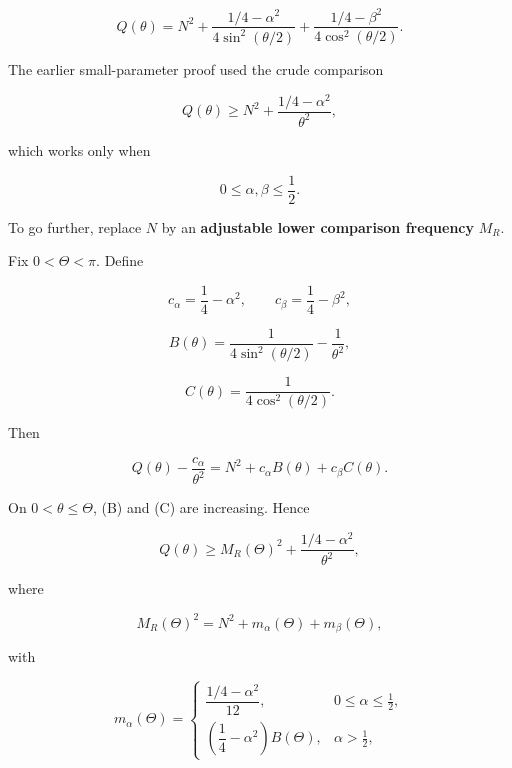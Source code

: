 \documentclass[11pt]{article}
\begin{document}
\begin{equation*}
\boxed{
Q(\theta)
=
N^2
+
\frac{1/4-\alpha^2}{4\sin^2(\theta/2)}
+
\frac{1/4-\beta^2}{4\cos^2(\theta/2)}.
}
\tag{14}
\end{equation*}


The earlier small-parameter proof used the crude comparison

\begin{equation*}
Q(\theta)\ge
N^2+\frac{1/4-\alpha^2}{\theta^2},
\end{equation*}


which works only when

\begin{equation*}
0\le\alpha,\beta\le\frac12.
\end{equation*}


To go further, replace \(N\) by an \textbf{adjustable lower comparison frequency} \(M_R\).

Fix \(0<\Theta<\pi\). Define

\begin{equation*}
c_\alpha=\frac14-\alpha^2,
\qquad
c_\beta=\frac14-\beta^2,
\end{equation*}


\begin{equation*}
B(\theta)=\frac{1}{4\sin^2(\theta/2)}-\frac{1}{\theta^2},
\end{equation*}


\begin{equation*}
C(\theta)=\frac{1}{4\cos^2(\theta/2)}.
\end{equation*}


Then

\begin{equation*}
Q(\theta)
-
\frac{c_\alpha}{\theta^2}
=
N^2+c_\alpha B(\theta)+c_\beta C(\theta).
\end{equation*}


On \(0<\theta\le\Theta\), (B) and (C) are increasing. Hence

\begin{equation*}
Q(\theta)
\ge
M_R(\Theta)^2+\frac{1/4-\alpha^2}{\theta^2},
\tag{15}
\end{equation*}


where

\begin{equation*}
\boxed{
M_R(\Theta)^2
=
N^2+m_\alpha(\Theta)+m_\beta(\Theta),
}
\tag{16}
\end{equation*}


with

\begin{equation*}
m_\alpha(\Theta)=
\begin{cases}
\dfrac{1/4-\alpha^2}{12},
&0\le\alpha\le\frac12,\\[1.2ex]
\left(\dfrac14-\alpha^2\right)B(\Theta),
&\alpha>\frac12,
\end{cases}
\tag{17}
\end{equation*}
\end{document}
